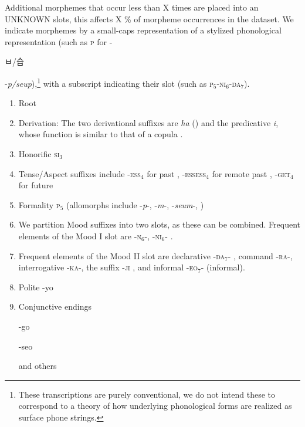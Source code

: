 \documentclass[11pt,letterpaper]{article}
\newcommand{\korean}[1]{\begin{CJK}{UTF8}{mj}#1\end{CJK}}
\begin{document}
Additional morphemes that occur less than X times are placed into an UNKNOWN slots, this affects X \% of morpheme occurrences in the dataset.
We indicate morphemes by a small-caps representation of a stylized phonological representation (such as \textsc{p} for -\korean{ㅂ/습}  -\textit{p/seup}),\footnote{These transcriptions are purely conventional, we do not intend these to correspond to a theory of how underlying phonological forms are realized as surface phone strings.} with a subscript indicating their slot (such as \textsc{p}$_5$-\textsc{ni}$_6$-\textsc{da}$_7$).

\begin{enumerate}
    \item Root
    \item Derivation: The two derivational suffixes are \textit{ha} (\citep[4.1.2]{yeon2010korean}) and the predicative \textit{i}, whose function is similar to that of a copula \citep[4.1.4]{yeon2010korean}.
    
    \item Honorific \textsc{si}$_3$ \citep[4.3.2, 4.4.1]{yeon2010korean}
    \item Tense/Aspect suffixes include -\textsc{ess}$_4$ for past \citep[4.5.1.1]{yeon2010korean}, -\textsc{essess}$_4$ for remote past \citep[4.5.1.2]{yeon2010korean}, -\textsc{get}$_4$ for future \citep[4.5.2.1]{yeon2010korean}
    \item Formality \textsc{p}$_5$ (allomorphs include -\textit{p}-, -\textit{m}-, -\textit{seum}-,  \citep[4.3.2]{yeon2010korean})
    \item We partition Mood suffixes into two slots, as these can be combined. Frequent elements of the Mood I slot are -\textsc{n}$_6$-, -\textsc{ni}$_6$- \citep[4.3.2]{yeon2010korean}.
    
    \item Frequent elements of the Mood II slot are declarative -\textsc{da}$_7$- \citep[4.3.2]{yeon2010korean}, command -\textsc{ra}-, interrogative -\textsc{ka}-, the suffix  -\textsc{ji} \citep[4.2.2-3]{yeon2010korean}, and informal -\textsc{eo}$_7$- (informal).
    
    \item Polite -yo
    \item Conjunctive endings
    
    -go
    
    -seo
    
    and others
    
\end{enumerate}
\end{document}
